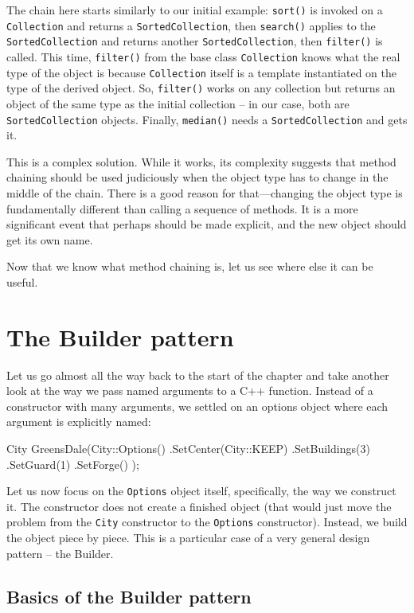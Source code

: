 The chain here starts similarly to our initial example: \texttt{sort()} is invoked on a \texttt{Collection} and returns a \texttt{SortedCollection}, then \texttt{search()} applies to the \texttt{SortedCollection} and returns another \texttt{SortedCollection}, then \texttt{filter()} is called. This time, \texttt{filter()} from the base class \texttt{Collection} knows what the real type of the object is because \texttt{Collection} itself is a template instantiated on the type of the derived object. So, \texttt{filter()} works on any collection but returns an object of the same type as the initial collection -- in our case, both are \texttt{SortedCollection} objects. Finally, \texttt{median()} needs a \texttt{SortedCollection} and gets it.

This is a complex solution. While it works, its complexity suggests that method chaining should be used judiciously when the object type has to change in the middle of the chain. There is a good reason for that---changing the object type is fundamentally different than calling a sequence of methods. It is a more significant event that perhaps should be made explicit, and the new object should get its own name.

Now that we know what method chaining is, let us see where else it can be useful.

\section{The Builder pattern}

Let us go almost all the way back to the start of the chapter and take another look at the way we pass named arguments to a C++ function. Instead of a constructor with many arguments, we settled on an options object where each argument is explicitly named:

\begin{code}
City GreensDale(City::Options()
  .SetCenter(City::KEEP)
  .SetBuildings(3)
  .SetGuard(1)
  .SetForge()
);
\end{code}

Let us now focus on the \texttt{Options} object itself, specifically, the way we construct it. The constructor does not create a finished object (that would just move the problem from the \texttt{City} constructor to the \texttt{Options} constructor). Instead, we build the object piece by piece. This is a particular case of a very general design pattern -- the Builder.

\subsection{Basics of the Builder pattern}

